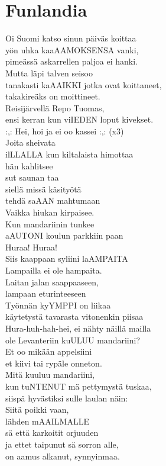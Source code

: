\section{Funlandia}
Oi Suomi katso sinun päiväs koittaa\\
yön uhka kaaAAMOKSENSA vanki,\\
pimeässä askarrellen paljoa ei hanki.\\
Mutta läpi talven seisoo\\
tanakasti kaAAIKKI jotka ovat koittaneet,\\
takakireäks on moittineet.\\
Reisijärvellä Repo Tuomas,\\
ensi kerran kun viIEDEN loput kivekset.\\
:,: Hei, hoi ja ei oo kassei :,: (x3)\\
Joita sheivata\\
ilLLALLA kun kiltalaista himottaa\\
hän kahlitsee\\
sut saunan taa\\
siellä missä käsityötä\\
tehdä saAAN mahtumaan\\
Vaikka hiukan kirpaisee.\\
Kun mandariinin tunkee\\
aAUTONI koulun parkkiin paan\\
Huraa! Huraa!\\
Siis kaappaan syliini laAMPAITA\\
Lampailla ei ole hampaita.\\
Laitan jalan saappaaseen,\\
lampaan eturinteeseen\\
Työnnän kyYMPPI on liikaa\\
käytetystä tavarasta vitonenkin piisaa\\
Hura-huh-hah-hei, ei nähty näillä mailla\\
ole Levanteriin kuULUU mandariini?\\
Et oo mikään appelsiini\\
et kiivi tai rypäle onneton.\\
Mitä kuuluu mandariini,\\
kun tuNTENUT mä pettymystä tuskaa,\\
siispä hyvästiksi sulle laulan näin:\\
Siitä poikki vaan,\\
lähden mAAILMALLE\\
sä että karkoitit orjuuden\\
ja ettet taipunut sä sorron alle,\\
on aamus alkanut, synnyinmaa.